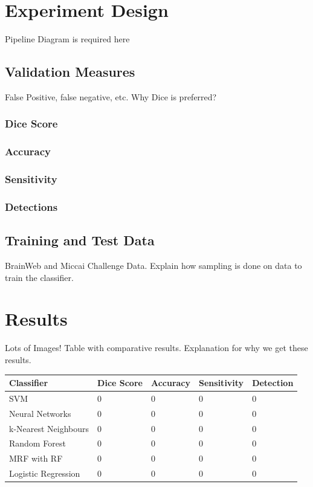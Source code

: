 \documentclass{article} %
\begin{document}
\section{Experiment Design}
Pipeline Diagram is required here

\subsection{Validation Measures}
False Positive, false negative, etc. Why Dice is preferred?
\subsubsection{Dice Score}
\subsubsection{Accuracy}
\subsubsection{Sensitivity}
\subsubsection{Detections}

\subsection{Training and Test Data}
BrainWeb and Miccai Challenge Data. Explain how sampling is done on data to train the classifier. 

\section{Results}
Lots of Images! Table with comparative results. Explanation for why we get these results. 

\begin{center}
\centering
\begin{tabular}{ | m{7em} | m{2cm}| m{2cm} | m{2cm} | m{2cm} | } 
\hline
\textbf{Classifier} & \textbf{Dice Score} & \textbf{Accuracy} & \textbf{Sensitivity} & \textbf{Detection}\\ 
\hline
SVM & 0 & 0 & 0 & 0  \\ 
\hline
Neural Networks & 0 & 0 & 0 & 0 \\ 
\hline
k-Nearest Neighbours & 0 & 0 & 0 & 0 \\ 
\hline
Random Forest & 0 & 0 & 0 & 0 \\ 
\hline
MRF with RF & 0 & 0 & 0 & 0 \\ 
\hline
Logistic Regression & 0 & 0 & 0 & 0 \\ 
\hline
\end{tabular}
\end{center}
\end{document}
